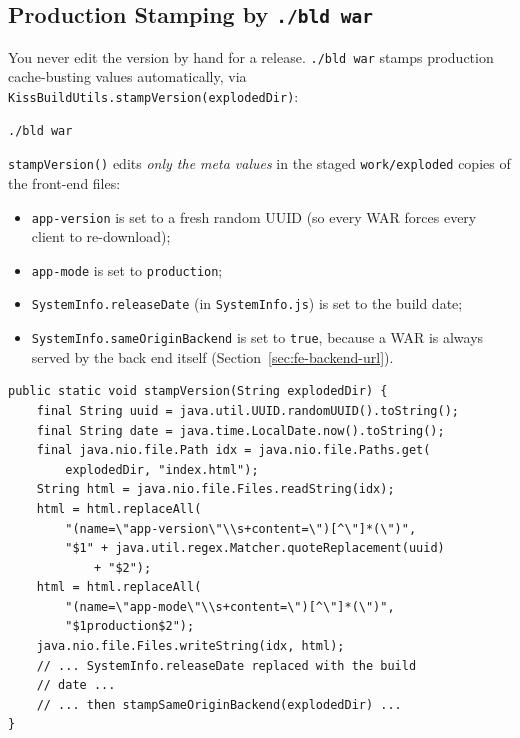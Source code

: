\subsection{Production Stamping by \texttt{./bld war}}
\label{sec:cache-war-stamp}

You never edit the version by hand for a release.  \texttt{./bld war} stamps production cache-busting values automatically, via \texttt{KissBuildUtils.stampVersion(explodedDir)}:

\begin{lstlisting}[style=shell]
./bld war
\end{lstlisting}

\noindent
\texttt{stampVersion()} edits \emph{only the meta values} in the staged \texttt{work/exploded} copies of the front-end files:

\begin{itemize}
  \item \texttt{app-version} is set to a fresh random UUID (so every WAR forces every client to re-download);
  \item \texttt{app-mode} is set to \texttt{production};
  \item \texttt{SystemInfo.releaseDate} (in \texttt{SystemInfo.js}) is set to the build date;
  \item \texttt{SystemInfo.sameOriginBackend} is set to \texttt{true}, because a WAR is always served by the back end itself (Section~\ref{sec:fe-backend-url}).
\end{itemize}

\begin{lstlisting}[style=java]
public static void stampVersion(String explodedDir) {
    final String uuid = java.util.UUID.randomUUID().toString();
    final String date = java.time.LocalDate.now().toString();
    final java.nio.file.Path idx = java.nio.file.Paths.get(
        explodedDir, "index.html");
    String html = java.nio.file.Files.readString(idx);
    html = html.replaceAll(
        "(name=\"app-version\"\\s+content=\")[^\"]*(\")",
        "$1" + java.util.regex.Matcher.quoteReplacement(uuid)
            + "$2");
    html = html.replaceAll(
        "(name=\"app-mode\"\\s+content=\")[^\"]*(\")",
        "$1production$2");
    java.nio.file.Files.writeString(idx, html);
    // ... SystemInfo.releaseDate replaced with the build
    // date ...
    // ... then stampSameOriginBackend(explodedDir) ...
}
\end{lstlisting}

